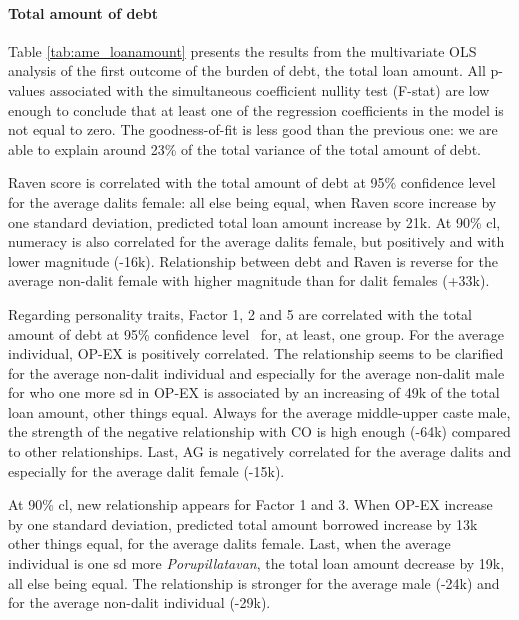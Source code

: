 \documentclass[a4paper, 11pt, onecolumn]{article}
\newcommand{\sd}{standard deviation}
\newcommand{\aebe}{all else being equal}
\newcommand{\ote}{other things equal}
\newcommand{\cl}{confidence level}
\newcommand{\PTCS}{PT\&CS}
\begin{document}


\paragraph{Total amount of debt}
Table \ref{tab:ame_loanamount} presents the results from the multivariate OLS analysis of the first outcome of the burden of debt, the total loan amount.
All p-values associated with the simultaneous coefficient nullity test (F-stat) are low enough to conclude that at least one of the regression coefficients in the model is not equal to zero.
The goodness-of-fit is less good than the previous one: we are able to explain around 23\% of the total variance of the total amount of debt.

Raven score is correlated with the total amount of debt at 95\% \cl~ for the average dalits female: \aebe, when Raven score increase by one \sd, predicted total loan amount increase by \rupee21k.
At 90\% cl, numeracy is also correlated for the average dalits female, but positively and with lower magnitude (-\rupee16k).
Relationship between debt and Raven is reverse for the average non-dalit female with higher magnitude than for dalit females (+\rupee33k).

Regarding personality traits, Factor 1, 2 and 5 are correlated with the total amount of debt at 95\% \cl~ for, at least, one group.
For the average individual, OP-EX is positively correlated.
The relationship seems to be clarified for the average non-dalit individual and especially for the average non-dalit male for who one more sd in OP-EX is associated by an increasing of \rupee49k of the total loan amount, \ote.
Always for the average middle-upper caste male, the strength of the negative relationship with CO is high enough (-\rupee64k) compared to other relationships. 
Last, AG is negatively correlated for the average dalits and especially for the average dalit female (-\rupee15k).

At 90\% cl, new relationship appears for Factor 1 and 3.
When OP-EX increase by one \sd, predicted total amount borrowed increase by \rupee13k \ote, for the average dalits female.
Last, when the average individual is one sd more \textit{Porupillatavan}, the total loan amount decrease by \rupee19k, \aebe.
The relationship is stronger for the average male (-\rupee24k) and for the average non-dalit individual (-\rupee29k).
 
\end{document}
